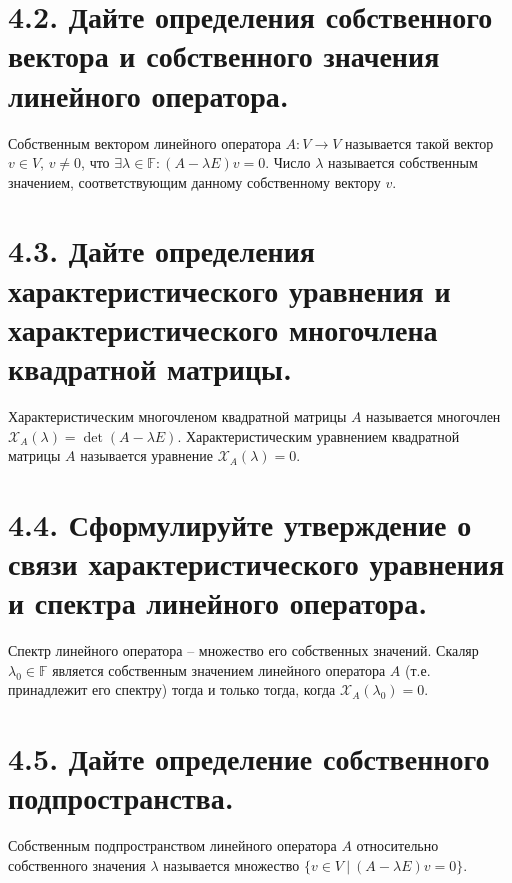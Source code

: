 \documentclass{article}
\begin{document}
\section*{\LARGE 4.2. Дайте определения собственного вектора и собственного значения линейного оператора.}
Собственным вектором линейного оператора $A : V \rightarrow V$ называется такой вектор $v \in V,\, v \ne 0$, что $\exists \lambda \in \mathbb{F} : (A - \lambda E)v = 0$. Число $\lambda$ называется собственным значением, соответствующим данному собственному вектору $v$.

\section*{\LARGE 4.3. Дайте определения характеристического уравнения и характеристического многочлена квадратной матрицы.}
Характеристическим многочленом квадратной матрицы $A$ называется многочлен $\mathcal{X}_A(\lambda) = \det{(A - \lambda E)}$.
\newline Характеристическим уравнением квадратной матрицы $A$ называется уравнение $\mathcal{X}_A(\lambda) = 0$.

\section*{\LARGE 4.4. Сформулируйте утверждение о связи характеристического уравнения и спектра линейного оператора.}
Спектр линейного оператора -- множество его собственных значений.
\newline Скаляр $\lambda_0 \in \mathbb{F}$ является собственным значением линейного оператора $A$ (т.е. принадлежит его спектру) тогда и только тогда, когда $\mathcal{X}_A(\lambda_0) = 0$.

\section*{\LARGE 4.5. Дайте определение собственного подпространства.}
Собственным подпространством линейного оператора $A$ относительно собственного значения $\lambda$ называется множество $\{v \in V \:|\: (A - \lambda E)v = 0\}$.
\end{document}
